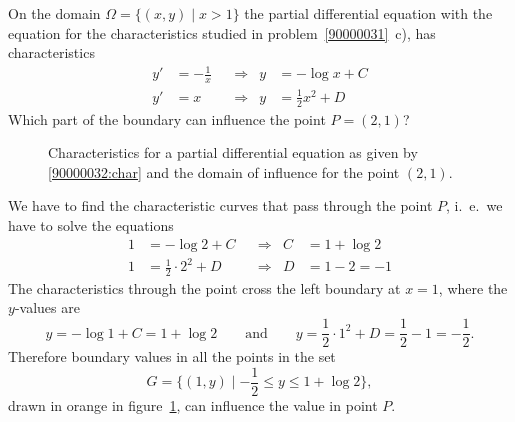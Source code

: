 On the domain
$
\Omega 
=
\{
(x,y)
\mid
x>1
\}
$
the partial differential equation with the equation for the characteristics
studied in problem~\ref{90000031}~c), has characteristics
\begin{equation}
\begin{aligned}
y'&=-\frac1x&&\Rightarrow& y&=-\log x+ C \\
y'&=x       &&\Rightarrow& y&=\frac12x^2+D
\end{aligned}
\label{90000032:char}
\end{equation}
Which part of the boundary can influence the point $P=(2,1)$?

\begin{loesung}
\begin{figure}[ht]
\centering
{}
\caption{Characteristics for a partial differential equation
as given by \eqref{90000032:char}
and the domain of influence for the point $(2,1)$.
\label{90000032:fig}}
\end{figure}
We have to find the characteristic curves that pass through the point
$P$, i.~e.~we have to solve the equations
\begin{align*}
1 &= -\log 2 + C           &&\Rightarrow& C &= 1+\log 2 \\
1 &= \frac12\cdot  2^2 + D &&\Rightarrow& D &= 1-2=-1
\end{align*}
The characteristics through the point cross
the left boundary at $x=1$, where the $y$-values are
\[
y
=
-\log1 + C
=
1+\log 2
\qquad\text{and}\qquad
y
=
\frac12\cdot 1^2 + D
=
\frac12-1
=
-\frac12.
\]
Therefore boundary values in all the points in the set
\[
G
=
\bigl\{ (1,y)\mid -{\textstyle\frac12} \le y \le 1+\log 2 \bigr\},
\]
drawn in orange in figure~\ref{90000032:fig}, can influence the
value in point $P$.
\end{loesung}
